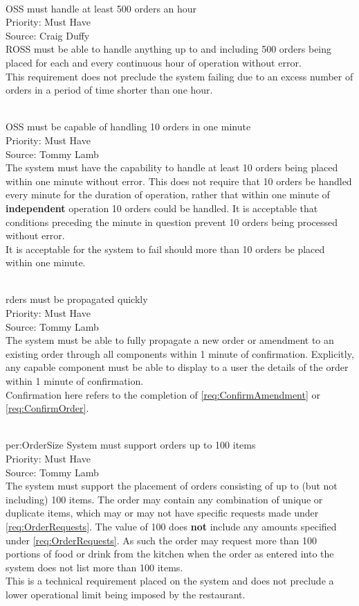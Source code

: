 \documentclass[11pt, a4paper]{report}
\def\itempar#1\\{\item \textbf{#1}\\} %
\begin{document}
\begin{enumerate}[resume*=nonfunctional]
\itempar ROSS must handle at least 500 orders an hour\\
Priority: Must Have\\
Source: Craig Duffy\\
ROSS must be able to handle anything up to and including 500 orders being placed for each and every continuous hour of operation without error.\\
This requirement does not preclude the system failing due to an excess number of orders in a period of time shorter than one hour.


\itempar ROSS must be capable of handling 10 orders in one minute\\
Priority: Must Have\\
Source: Tommy Lamb\\
The system must have the capability to handle at least 10 orders being placed within one minute without error. This does not require that 10 orders be handled every minute for the duration of operation, rather that within one minute of \textbf{independent} operation 10 orders could be handled. It is acceptable that conditions preceding the minute in question prevent 10 orders being processed without error.\\
It is acceptable for the system to fail should more than 10 orders be placed within one minute.

\itempar Orders must be propagated quickly\\
Priority: Must Have\\
Source: Tommy Lamb\\
The system must be able to fully propagate a new order or amendment to an existing order through all components within 1 minute of confirmation. Explicitly, any capable component must be able to display to a user the details of the order within 1 minute of confirmation.\\
Confirmation here refers to the completion of \autoref{req:ConfirmAmendment} or \autoref{req:ConfirmOrder}.

\itempar \label{per:OrderSize} System must support orders up to 100 items\\
Priority: Must Have\\
Source: Tommy Lamb\\
The system must support the placement of orders consisting of up to (but not including) 100 items. The order may contain any combination of unique or duplicate items, which may or may not have specific requests made under \autoref{req:OrderRequests}. The value of 100 does \textbf{not} include any amounts specified under \autoref{req:OrderRequests}. As such the order may request more than 100 portions of food or drink from the kitchen when the order as entered into the system does not list more than 100 items.\\
This is a technical requirement placed on the system and does not preclude a lower operational limit being imposed by the restaurant.

\end{enumerate}
\end{document}

